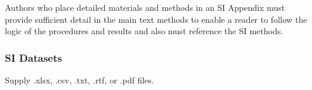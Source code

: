 \documentclass[9pt,twoside]{pnas-new}
\begin{document}
Authors who place detailed materials and methods in an SI Appendix must provide sufficient detail in the main text methods to enable a reader to follow the logic of the procedures and results and also must reference the SI methods. 

\subsubsection*{SI Datasets} 

Supply .xlsx, .csv, .txt, .rtf, or .pdf files. 


\showacknow %


\end{document}
